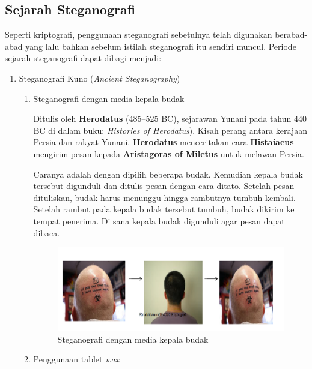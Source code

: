 	\subsection{Sejarah Steganografi}
	Seperti kriptografi, penggunaan steganografi sebetulnya telah digunakan berabad-abad yang lalu bahkan sebelum istilah steganografi itu sendiri muncul. Periode sejarah steganografi dapat dibagi menjadi:
	\begin{enumerate}
		\item Steganografi Kuno (\emph{Ancient Steganography})
			\begin{enumerate}
				\item Steganografi dengan media kepala budak
				
				Ditulis oleh \textbf{Herodatus} (485–525 BC), sejarawan Yunani pada tahun 440 BC di dalam buku: \emph{Histories of Herodatus}). Kisah perang antara kerajaan Persia dan rakyat Yunani. \textbf{Herodatus} menceritakan cara \textbf{Histaiaeus} mengirim pesan kepada \textbf{Aristagoras of Miletus} untuk melawan Persia. 
				
				Caranya adalah dengan dipilih beberapa budak. Kemudian kepala budak tersebut digunduli dan ditulis pesan dengan cara ditato. Setelah pesan dituliskan, budak harus menunggu hingga rambutnya tumbuh kembali. Setelah rambut pada kepala budak tersebut tumbuh, budak dikirim ke tempat penerima. Di sana kepala budak digunduli agar pesan dapat dibaca.
					\begin{figure}[H]
						\centering
						\includegraphics[width=1\textwidth]{gambar/steganografi_kepalabudak}
						\caption{Steganografi dengan media kepala budak}
						\label{steganografi_kepalabudak}
					\end{figure}
				
				\item Penggunaan tablet \emph{wax}
				

\end{enumerate}
\end{enumerate}
